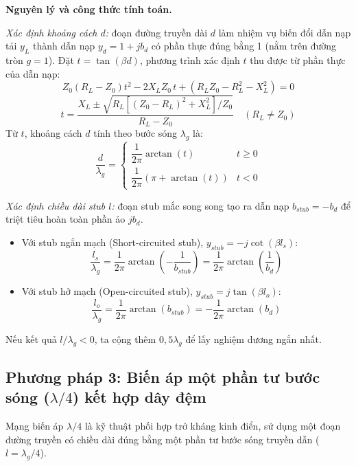 \documentclass[a4paper]{report}
\newcommand\Zo{Z_0}
\begin{document}
\textbf{Nguyên lý và công thức tính toán.}

\emph{Xác định khoảng cách $d$:} đoạn đường truyền dài $d$ làm nhiệm vụ biến đổi dẫn nạp tải $y_L$ thành dẫn nạp $y_d=1+jb_d$ có phần thực đúng bằng 1 (nằm trên đường tròn $g=1$). Đặt $t=\tan(\beta d)$, phương trình xác định $t$ thu được từ phần thực của dẫn nạp:
\begin{equation}
  \Zo(R_L-\Zo)t^2-2X_L\Zo\,t+(R_L\Zo-R_L^2-X_L^2)=0
\end{equation}
\begin{equation}
  t=\frac{X_L\pm\sqrt{R_L\left[(\Zo-R_L)^2+X_L^2\right]/\Zo}}{R_L-\Zo}\quad(R_L\neq\Zo)
\end{equation}
Từ $t$, khoảng cách $d$ tính theo bước sóng $\lambda_g$ là:
\begin{equation}
  \frac{d}{\lambda_g}=
  \begin{cases}
    \dfrac{1}{2\pi}\arctan(t) & t\ge 0\\[2mm]
    \dfrac{1}{2\pi}\left(\pi+\arctan(t)\right) & t<0
  \end{cases}
\end{equation}

\emph{Xác định chiều dài stub $l$:} đoạn stub mắc song song tạo ra dẫn nạp $b_{stub}=-b_d$ để triệt tiêu hoàn toàn phần ảo $jb_d$.
\begin{itemize}
  \item Với stub ngắn mạch (Short-circuited stub), $y_{stub}=-j\cot(\beta l_s)$:
  \begin{equation}
    \frac{l_s}{\lambda_g}=\frac{1}{2\pi}\arctan\!\left(-\frac{1}{b_{stub}}\right)=\frac{1}{2\pi}\arctan\!\left(\frac{1}{b_d}\right)
  \end{equation}
  \item Với stub hở mạch (Open-circuited stub), $y_{stub}=j\tan(\beta l_o)$:
  \begin{equation}
    \frac{l_o}{\lambda_g}=\frac{1}{2\pi}\arctan\!\left(b_{stub}\right)=-\frac{1}{2\pi}\arctan\!\left(b_d\right)
  \end{equation}
\end{itemize}
Nếu kết quả $l/\lambda_g<0$, ta cộng thêm $0{,}5\lambda_g$ để lấy nghiệm dương ngắn nhất.

\subsection{Phương pháp 3: Biến áp một phần tư bước sóng ($\lambda/4$) kết hợp dây đệm}
Mạng biến áp $\lambda/4$ là kỹ thuật phối hợp trở kháng kinh điển, sử dụng một đoạn đường truyền có chiều dài đúng bằng một phần tư bước sóng truyền dẫn ($l=\lambda_g/4$).
\end{document}
